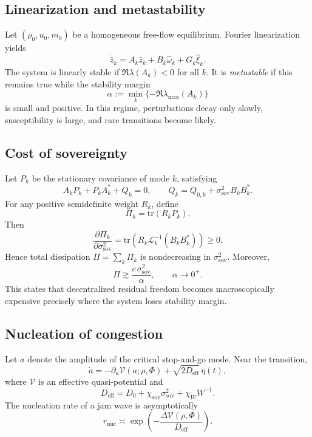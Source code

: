\documentclass[11pt]{article}
\begin{document}
\subsection{Linearization and metastability}
Let $(\rho_0,u_0,m_0)$ be a homogeneous free-flow equilibrium. Fourier linearization yields
\begin{equation}
\dot{\hat z}_k = A_k\hat z_k + B_k\hat \omega_k + G_k\hat \xi_k.
\end{equation}
The system is linearly stable if $\Re\lambda(A_k)<0$ for all $k$. It is \emph{metastable} if this remains true while the stability margin
\begin{equation}
\alpha := \min_k\{-\Re\lambda_{\max}(A_k)\}
\end{equation}
is small and positive. In this regime, perturbations decay only slowly, susceptibility is large, and rare transitions become likely.

\subsection{Cost of sovereignty}
Let $P_k$ be the stationary covariance of mode $k$, satisfying
\begin{equation}
A_kP_k + P_kA_k^{\ast} + Q_k = 0,
\qquad
Q_k = Q_{0,k} + \sigma_{\mathrm{sov}}^2 B_kB_k^{\ast}.
\end{equation}
For any positive semidefinite weight $R_k$, define
\begin{equation}
\Pi_k = \mathrm{tr}(R_kP_k).
\end{equation}
Then
\begin{equation}
\frac{\partial \Pi_k}{\partial \sigma_{\mathrm{sov}}^2}
=
\mathrm{tr}\!\left(R_k\mathcal L_k^{-1}(B_kB_k^{\ast})\right) \ge 0.
\end{equation}
Hence total dissipation $\Pi = \sum_k \Pi_k$ is nondecreasing in $\sigma_{\mathrm{sov}}^2$. Moreover,
\begin{equation}
\Pi \gtrsim \frac{c\,\sigma_{\mathrm{sov}}^2}{\alpha}, \qquad \alpha\to 0^+.
\end{equation}
This states that decentralized residual freedom becomes macroscopically expensive precisely where the system loses stability margin.

\subsection{Nucleation of congestion}
Let $a$ denote the amplitude of the critical stop-and-go mode. Near the transition,
\begin{equation}
\dot a = -\partial_a \mathcal V(a;\rho,\Phi) + \sqrt{2D_{\mathrm{eff}}}\,\eta(t),
\end{equation}
where $\mathcal V$ is an effective quasi-potential and
\begin{equation}
D_{\mathrm{eff}} = D_0 + \chi_{\mathrm{sov}}\sigma_{\mathrm{sov}}^2 + \chi_W W^{-1}.
\end{equation}
The nucleation rate of a jam wave is asymptotically
\begin{equation}
r_{\mathrm{nuc}} \asymp \exp\!\left(-\frac{\Delta \mathcal V(\rho,\Phi)}{D_{\mathrm{eff}}}\right).
\end{equation}
\end{document}
